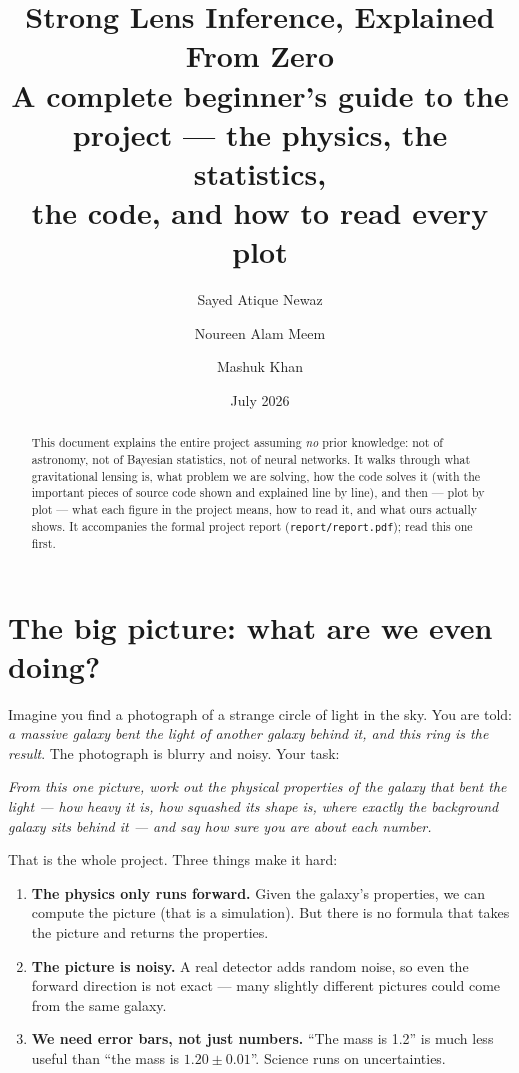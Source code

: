 \documentclass[11pt,a4paper]{article}
\title{Strong Lens Inference, Explained From Zero\\[0.5em]
\large A complete beginner's guide to the project --- the physics, the statistics,\\
the code, and how to read every plot}
\author{Sayed Atique Newaz \and Noureen Alam Meem \and Mashuk Khan}
\date{July 2026}
\begin{document}
\maketitle

\begin{abstract}
\noindent This document explains the entire project assuming \emph{no} prior
knowledge: not of astronomy, not of Bayesian statistics, not of neural networks.
It walks through what gravitational lensing is, what problem we are solving, how
the code solves it (with the important pieces of source code shown and explained
line by line), and then --- plot by plot --- what each figure in the project means,
how to read it, and what ours actually shows. It accompanies the formal project
report (\texttt{report/report.pdf}); read this one first.
\end{abstract}

\tableofcontents
\newpage

\section{The big picture: what are we even doing?}

Imagine you find a photograph of a strange circle of light in the sky. You are
told: \emph{a massive galaxy bent the light of another galaxy behind it, and this
ring is the result}. The photograph is blurry and noisy. Your task:

\begin{center}
\emph{From this one picture, work out the physical properties of the galaxy that
bent the light --- how heavy it is, how squashed its shape is, where exactly the
background galaxy sits behind it --- and say how sure you are about each number.}
\end{center}

That is the whole project. Three things make it hard:

\begin{enumerate}
  \item \textbf{The physics only runs forward.} Given the galaxy's properties, we
  can compute the picture (that is a simulation). But there is no formula that
  takes the picture and returns the properties.
  \item \textbf{The picture is noisy.} A real detector adds random noise, so even
  the forward direction is not exact --- many slightly different pictures could
  come from the same galaxy.
  \item \textbf{We need error bars, not just numbers.} ``The mass is 1.2'' is
  much less useful than ``the mass is $1.20 \pm 0.01$''. Science runs on
  uncertainties.
\end{enumerate}
\end{document}
